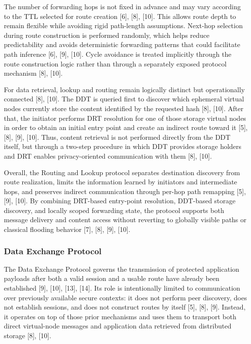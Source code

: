 \documentclass[12pt,a4paper]{article}
\begin{document}
The number of forwarding hops is not fixed in advance and may vary according to the TTL selected for route creation [6], [8], [10]. This allows route depth to remain flexible while avoiding rigid path-length assumptions. Next-hop selection during route construction is performed randomly, which helps reduce predictability and avoids deterministic forwarding patterns that could facilitate path inference [6], [9], [10]. Cycle avoidance is treated implicitly through the route construction logic rather than through a separately exposed protocol mechanism [8], [10].

For data retrieval, lookup and routing remain logically distinct but operationally connected [8], [10]. The DDT is queried first to discover which ephemeral virtual nodes currently store the content identified by the requested hash [8], [10]. After that, the initiator performs DRT resolution for one of those storage virtual nodes in order to obtain an initial entry point and create an indirect route toward it [5], [8], [9], [10]. Thus, content retrieval is not performed directly from the DDT itself, but through a two-step procedure in which DDT provides storage holders and DRT enables privacy-oriented communication with them [8], [10].

Overall, the Routing and Lookup protocol separates destination discovery from route realization, limits the information learned by initiators and intermediate hops, and preserves indirect communication through per-hop path remapping [5], [9], [10]. By combining DRT-based entry-point resolution, DDT-based storage discovery, and locally scoped forwarding state, the protocol supports both message delivery and content access without reverting to globally visible paths or classical flooding behavior [7], [8], [9], [10].

\subsubsection{Data Exchange Protocol}

The Data Exchange Protocol governs the transmission of protected application payloads after both a valid session and a usable route have already been established [9], [10], [13], [14]. Its role is intentionally limited to communication over previously available secure contexts: it does not perform peer discovery, does not establish sessions, and does not construct routes by itself [5], [8], [9]. Instead, it operates on top of those prior mechanisms and uses them to transport both direct virtual-node messages and application data retrieved from distributed storage [8], [10].
\end{document}
